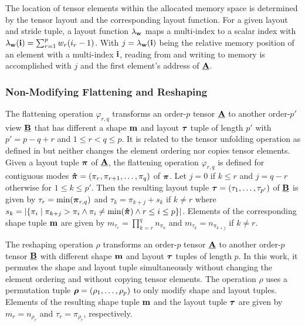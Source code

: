 The location of tensor elements within the allocated memory space is determined by the tensor layout and the corresponding layout function.
For a given layout and stride tuple, a layout function $\lambda_{\mathbf{w}}$ maps a multi-index to a scalar index with $\lambda_{\mathbf{w}}(\mathbf{i}) = \sum_{r=1}^p w_r (i_r-1)$.
With $j = \lambda_{\mathbf{w}} (\mathbf{i})$ being the relative memory position of an element with a multi-index $\mathbf{i}$, reading from and writing to memory is accomplished with $j$ and the first element's address of $\underline{\mathbf{A}}$.


\subsubsection{Non-Modifying Flattening and Reshaping}
\label{sec:preliminaries:flattening.reshaping}
The flattening operation $\varphi_{r,q}$ transforms an order-$p$ tensor $\underline{\mathbf{A}}$ to another order-$p'$ view $\underline{\mathbf{B}}$ that has different a shape $\mathbf{m}$ and layout $\boldsymbol{\tau}$ tuple of length $p'$ with $p' = p-q+r$ and $1 \leq r < q \leq p$.
It is related to the tensor unfolding operation as defined in \cite[p.459]{kolda:2009:decompositions} but neither changes the element ordering nor copies tensor elements.
Given a layout tuple $\boldsymbol{\pi}$ of $\underline{\mathbf{A}}$, the flattening operation $\varphi_{r,q}$ is defined for contiguous modes $\boldsymbol{\hat{\pi}} = (\pi_r,\pi_{r+1}, \dots, \pi_{q})$ of $\boldsymbol{\pi}$.
Let $j = 0$ if $k \leq r$ and $j = q-r$ otherwise for $1 \leq k \leq p'$.
Then the resulting layout tuple $\boldsymbol{\tau} = (\tau_1,\dots,\tau_{p'})$ of $\underline{\mathbf{B}}$ is given by $\tau_r = \min(\boldsymbol{\pi}_{r,q})$ and $\tau_{k} = \pi_{k+j} + s_k$ if $k \neq r$ where $s_k = \left| \{ \pi_i \mid \pi_{k+j} > \pi_i \wedge \pi_i \neq \min(\boldsymbol{\hat{\pi}}) \wedge r \leq i \leq p \} \right|$.
Elements of the corresponding shape tuple $\mathbf{m}$ are given by $m_{\tau_r} = \prod_{k=r}^q n_{\pi_k}$ and $m_{\tau_k} = n_{\pi_{k+j}}$ if $k \neq r$.

The reshaping operation $\rho$ transforms an order-$p$ tensor $\underline{\mathbf{A}}$ to another order-$p$ tensor $\underline{\mathbf{B}}$ with different shape $\mathbf{m}$ and layout $\boldsymbol{\tau}$ tuples of length $p$.
In this work, it permutes the shape and layout tuple simultaneously without changing the element ordering and without copying tensor elements.
The operation $\rho$ uses a permutation tuple $\boldsymbol{\rho} = (\rho_1,\dots,\rho_p)$ to only modify shape and layout tuples.
Elements of the resulting shape tuple $\mathbf{m}$ and the layout tuple $\boldsymbol{\tau}$ are given by $m_r = n_{\rho_r}$ and $\tau_r = \pi_{\rho_r}$, respectively.



